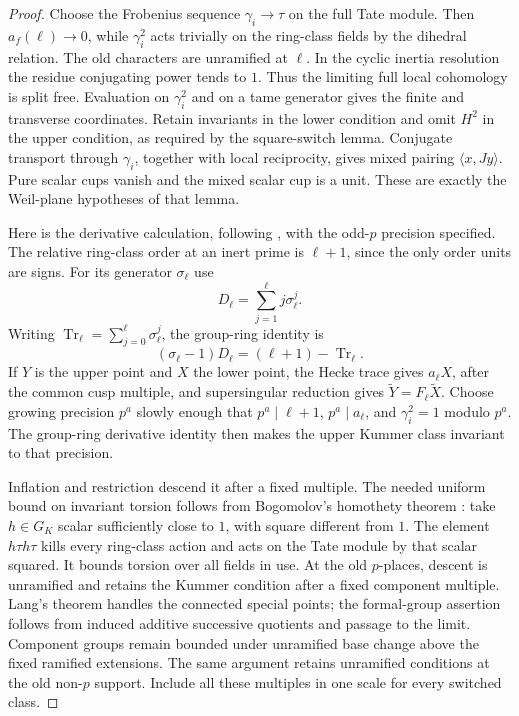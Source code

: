 \begin{proof}
Choose the Frobenius sequence \(\gamma_i\to\tau\) on the full Tate
module.  Then \(a_f(\ell)\to0\), while
\(\gamma_i^2\) acts trivially on the ring-class fields by the
dihedral relation.  The old characters are unramified at \(\ell\).
In the cyclic inertia resolution the residue conjugating power
tends to \(1\).  Thus the limiting full local cohomology is split
free.  Evaluation on \(\gamma_i^2\) and on a tame generator gives
the finite and transverse coordinates.  Retain invariants in the
lower condition and omit \(H^2\) in the upper condition, as required
by the square-switch lemma.  Conjugate transport through
\(\gamma_i\), together with local reciprocity, gives mixed pairing
\(\langle x,Jy\rangle\).  Pure scalar cups vanish and the mixed
scalar cup is a unit.  These are exactly the Weil-plane hypotheses
of that lemma.

Here is the derivative calculation, following
\cite[Section~9, \emph{Inert derivative identity}, equation (K)]{B}, with the
odd-\(p\) precision specified.  The relative ring-class order at
an inert prime is \(\ell+1\), since the only order units are signs.
For its generator \(\sigma_\ell\) use
\[
 D_\ell=\sum_{j=1}^{\ell}j\sigma_\ell^j.
\]
Writing \(\operatorname{Tr}_\ell=\sum_{j=0}^{\ell}\sigma_\ell^j\),
the group-ring identity is
\[
 (\sigma_\ell-1)D_\ell=(\ell+1)-\operatorname{Tr}_\ell.
\]
If \(Y\) is the upper point and \(X\) the lower point, the Hecke
trace gives \(a_\ell X\), after the common cusp multiple, and
supersingular reduction gives
\(\widetilde Y=F_\ell\widetilde X\).
Choose growing precision \(p^a\) slowly enough that
\(p^a\mid \ell+1\), \(p^a\mid a_\ell\), and
\(\gamma_i^2=1\) modulo \(p^a\).
The group-ring derivative identity then makes the upper Kummer
class invariant to that precision.

Inflation and restriction descend it after a fixed multiple.
The needed uniform bound on invariant torsion follows from
Bogomolov's homothety theorem \cite{Bogomolov}: take
\(h\in G_K\) scalar sufficiently close to \(1\), with square
different from \(1\).  The element \(h\tau h\tau\) kills every
ring-class action and acts on the Tate module by that scalar
squared.  It bounds torsion over all fields in use.  At the old
\(p\)-places, descent is unramified and retains the Kummer
condition after a fixed component multiple.  Lang's theorem handles
the connected special points; the formal-group assertion follows
from induced additive successive quotients and passage to the
limit.  Component groups remain bounded under unramified base
change above the fixed ramified extensions.  The same argument
retains unramified conditions at the old non-\(p\) support.  Include
all these multiples in one scale for every switched class.


\end{proof}
